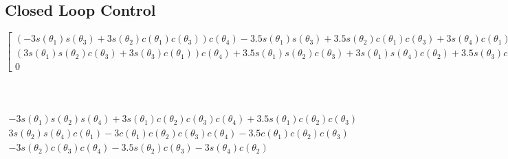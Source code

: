 \documentclass[12pt]{article}
\begin{document}
\begin{landscape}
\begin{center}
\begin{tabular}{c}
\end{tabular}
\end{center}
\end{landscape}

\subsection{Closed Loop Control}
$\left[\begin{matrix}\left(- 3 s{\left(\theta_{1} \right)} s{\left(\theta_{3} \right)} + 3 s{\left(\theta_{2} \right)} c{\left(\theta_{1} \right)} c{\left(\theta_{3} 
\right)}\right) c{\left(\theta_{4} \right)} - 3.5 s{\left(\theta_{1} \right)} s{\left(\theta_{3} \right)} + 3.5 s{\left(\theta_{2} \right)} c{\left(\theta_{1} \right)} c{\left(\theta_{3} \right)} + 3 s{\left(\theta_{4} \right)} c{\left(\theta_{1} \right)} c{\left(\theta_{2} \right)}\\\left(3 s{\left(\theta_{1} \right)} s{\left(\theta_{2} \right)} c{\left(\theta_{3} \right)} + 3 s{\left(\theta_{3} \right)} c{\left(\theta_{1} \right)}\right) c{\left(\theta_{4} \right)} + 3.5 s{\left(\theta_{1} \right)} s{\left(\theta_{2} \right)} c{\left(\theta_{3} \right)} + 3 s{\left(\theta_{1} \right)} s{\left(\theta_{4} \right)} c{\left(\theta_{2} \right)} + 3.5 s{\left(\theta_{3} \right)} c{\left(\theta_{1} \right)}\\0\end{matrix}\right.$\\\\\\\\
$\begin{matrix}- 3 s{\left(\theta_{1} \right)} s{\left(\theta_{2} \right)} s{\left(\theta_{4} \right)} + 3 s{\left(\theta_{1} \right)} c{\left(\theta_{2} \right)} c{\left(\theta_{3} \right)} c{\left(\theta_{4} \right)} + 3.5 s{\left(\theta_{1} \right)} c{\left(\theta_{2} \right)} c{\left(\theta_{3} \right)}\\3 s{\left(\theta_{2} \right)} s{\left(\theta_{4} \right)} c{\left(\theta_{1} \right)} - 3 c{\left(\theta_{1} \right)} c{\left(\theta_{2} \right)} c{\left(\theta_{3} \right)} c{\left(\theta_{4} \right)} - 3.5 c{\left(\theta_{1} \right)} c{\left(\theta_{2} \right)} c{\left(\theta_{3} \right)}\\- 3 s{\left(\theta_{2} \right)} c{\left(\theta_{3} \right)} c{\left(\theta_{4} \right)} - 3.5 s{\left(\theta_{2} \right)} c{\left(\theta_{3} \right)} - 3 s{\left(\theta_{4} \right)} c{\left(\theta_{2} \right)}\end{matrix}$\\\\\\\\
\end{document}

